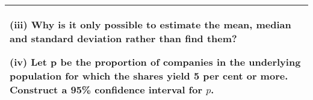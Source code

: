 \documentclass[a4paper,12pt]{article}
\begin{document}
\begin{table}[ht!]
 
\centering
 
\begin{tabular}{|p{15cm}|}
 
\hline  

(iii) Why is it only possible to estimate the mean, median and standard deviation rather than find them? 
 
(iv) Let p be the proportion of companies in the underlying population for which the shares yield 5 per cent or more.  Construct a 95\% confidence interval for $p$. 
 
\\ \hline
  
\end{tabular}

\end{table} 
\end{document}
